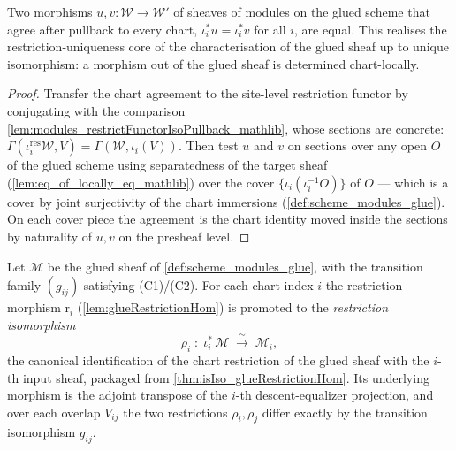 \begin{lemma}
  \label{lem:gr_pullback_jointly_faithful}
  Two morphisms \(u, v : \mathcal{W} \to \mathcal{W}'\) of sheaves of modules on the
  glued scheme that agree after pullback to every chart, \(\iota_i^{*}u = \iota_i^{*}v\)
  for all \(i\), are equal. This realises the restriction-uniqueness core of the
  characterisation of the glued sheaf up to unique isomorphism: a morphism out of the
  glued sheaf is determined chart-locally.
\end{lemma}
\begin{proof}
  \leanok
  Transfer the chart agreement to the site-level restriction functor by conjugating
  with the comparison \cref{lem:modules_restrictFunctorIsoPullback_mathlib}, whose
  sections are concrete: \(\Gamma(\iota_i^{\mathrm{res}}\mathcal{W}, V) =
  \Gamma(\mathcal{W}, \iota_i(V))\). Then test \(u\) and \(v\) on sections over any
  open \(O\) of the glued scheme using separatedness of the target sheaf
  (\cref{lem:eq_of_locally_eq_mathlib}) over the cover \(\{\iota_i(\iota_i^{-1}O)\}\)
  of \(O\) — which is a cover by joint surjectivity of the chart immersions
  (\cref{def:scheme_modules_glue}). On each cover piece the agreement is the chart
  identity moved inside the sections by naturality of \(u, v\) on the presheaf level.
\end{proof}

\begin{definition}

  \label{def:glueRestrictionIso}
  Let \(\mathcal{M}\) be the glued sheaf of \cref{def:scheme_modules_glue}, with the
  transition family \((g_{ij})\) satisfying (C1)/(C2). For each chart index \(i\) the
  restriction morphism \(\mathrm{r}_i\) (\cref{lem:glueRestrictionHom}) is promoted to
  the \emph{restriction isomorphism}
  \[
    \rho_i \;:\; \iota_i^{*}\,\mathcal{M} \;\xrightarrow{\ \sim\ }\; \mathcal{M}_i,
  \]
  the canonical identification of the chart restriction of the glued sheaf with the
  \(i\)-th input sheaf, packaged from \cref{thm:isIso_glueRestrictionHom}. Its
  underlying morphism is the adjoint transpose of the \(i\)-th descent-equalizer
  projection, and over each overlap \(V_{ij}\) the two restrictions \(\rho_i, \rho_j\)
  differ exactly by the transition isomorphism \(g_{ij}\).
\end{definition}
